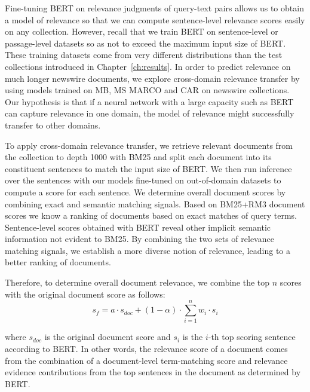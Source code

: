 Fine-tuning BERT on relevance judgments of query-text pairs allows us to obtain a model of relevance so that we can compute sentence-level relevance scores easily on any collection.
However, recall that we train BERT on sentence-level or passage-level datasets so as not to exceed the maximum input size of BERT.
These training datasets come from very different distributions than the test collections introduced in Chapter~\ref{ch:results}.
In order to predict relevance on much longer newswire documents, we explore cross-domain relevance transfer by using models trained on MB, MS MARCO and CAR on newswire collections.
Our hypothesis is that if a neural network with a large capacity such as BERT can capture relevance in one domain, the model of relevance might successfully transfer to other domains.

To apply cross-domain relevance transfer, we retrieve relevant documents from the collection to depth 1000 with BM25 and split each document into its constituent sentences to match the input size of BERT.
We then run inference over the sentences with our models fine-tuned on out-of-domain datasets to compute a score for each sentence.
We determine overall document scores by combining exact and semantic matching signals.
Based on BM25+RM3 document scores we know a ranking of documents based on exact matches of query terms.
Sentence-level scores obtained with BERT reveal other implicit semantic information not evident to BM25.
By combining the two sets of relevance matching signals, we establish a more diverse notion of relevance, leading to a better ranking of documents.

Therefore, to determine overall document relevance, we combine the top $ n $ scores with the original document score as follows:
\begin{equation} \label{eq:1}
s_f = a \cdot s_{doc}  + (1 - \alpha) \cdot \sum_{i = 1}^n w_i \cdot s_i
\end{equation}

\noindent where $ s_{doc} $ is the original document score and $ s_i $ is the $ i $-th top scoring sentence according to BERT.
In other words, the relevance score of a document comes from the combination of a document-level term-matching score and relevance evidence contributions from the top sentences in the document as determined by BERT.


